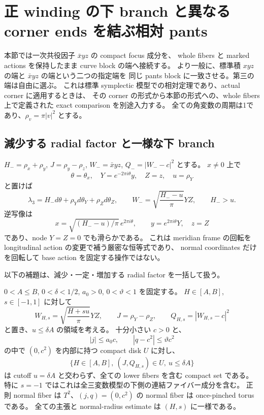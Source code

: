 \section{正 winding の下 branch と異なる corner ends を結ぶ相対 pants}
\label{pe:section}

本節では一次共役因子 $\bar x yz$ の compact focus 成分を、
whole fibers と marked actions を保持したまま curve block の端へ接続する。
より一般に、標準積 $xyz$ の端と $\bar x yz$ の端という二つの指定端を
同じ pants block に一致させる。第三の端は自由に選ぶ。
これは標準 symplectic 模型での相対定理であり、actual corner に適用するときは、
その corner の形式から本節の形式への、whole fibers 上で定義された exact comparison を別途入力する。
全ての角変数の周期は1であり、$\rho_v=\pi|v|^2$ とする。

\subsection{減少する radial factor と一様な下 branch}

$H_-=\rho_x+\rho_y$, $J=\rho_y-\rho_z$,
$W_-=\bar x yz$, $Q_-=|W_--c|^2$ とする。
$x\ne0$ 上で
\[
 \theta=\theta_x,\quad Y=e^{-2\pi i\theta}y,\quad Z=z,
 \quad u=\rho_Y
\]
と置けば
\begin{equation}\label{pe:exact}
 \lambda_3=H_-d\theta+\rho_Yd\theta_Y+\rho_Zd\theta_Z,
 \qquad W_-=\sqrt{\frac{H_--u}{\pi}}YZ,
 \qquad H_->u.
\end{equation}
逆写像は
\[
 x=\sqrt{(H_--u)/\pi}\,e^{2\pi i\theta},\qquad
 y=e^{2\pi i\theta}Y,\quad z=Z
\]
であり、node $Y=Z=0$ でも滑らかである。
これは meridian frame の回転を longitudinal action の変更で補う厳密な恒等式であり、
normal coordinates だけを回転して base action を固定する操作ではない。

以下の補題は、減少・一定・増加する radial factor を一括して扱う。

\begin{lemma}\label{pe:uniform}
$0<A\le B$, $0<\delta<1/2$, $a_0>0$, $0<\vartheta<1$ を固定する。
$H\in[A,B]$, $s\in[-1,1]$ に対して
\[
 W_{H,s}=\sqrt{\frac{H+s u}{\pi}}YZ,
 \qquad J=\rho_Y-\rho_Z,
 \qquad Q_{H,s}=|W_{H,s}-c|^2
\]
と置き、$u\le\delta A$ の領域を考える。
十分小さい $c>0$ と、
\[
 |j|\le a_0c,\qquad |q-c^2|\le\vartheta c^2
\]
の中で $(0,c^2)$ を内部に持つ compact disk $U$ に対し、
\[
 \{H\in[A,B],\ (J,Q_{H,s})\in U,\ u\le\delta A\}
\]
は cutoff $u=\delta A$ と交わらず、全ての lower fibers を含む compact set である。
特に $s=-1$ ではこれは全三変数模型の下側の連結ファイバー成分を含む。
正則 normal fiber は $T^2$、$(j,q)=(0,c^2)$ の normal fiber は once-pinched torus である。
全ての主張と normal-radius estimate は $(H,s)$ に一様である。
\end{lemma}

